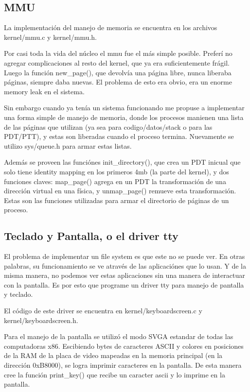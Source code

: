 \subsection{MMU}

La implementación del manejo de memoria se encuentra en los archivos
kernel/mmu.c y kernel/mmu.h.

Por casi toda la vida del núcleo el mmu fue el más simple posible. Preferí no
agregar complicaciones al resto del kernel, que ya era suficientemente frágil.
Luego la función new\_page(), que devolvía una página libre, nunca liberaba
páginas, siempre daba nuevas. El problema de esto era obvio, era un enorme
memory leak en el sistema.

Sin embargo cuando ya tenía un sistema funcionando me propuse a implementar una
forma simple de manejo de memoria, donde los procesos manienen una lista de las
páginas que utilizan (ya sea para codigo/datos/stack o para las PDT/PTT), y
estas son liberadas cuando el proceso termina. Nuevamente se utilizo
sys/queue.h para armar estas listas.

Además se proveen las funciónes init\_directory(), que crea un PDT inicual que
solo tiene identity mapping en los primeros 4mb (la parte del kernel), y dos
funciones claves: map\_page() agrega en un PDT la transformación de una
dirección virtual en una física, y unmap\_page() remueve esta transformación.
Estas son las funciones utilizadas para armar el directorio de páginas de un
proceso.

\subsection{Teclado y Pantalla, o el driver tty}

El problema de implementar un file system es que este no se puede ver. En otras
palabras, su funcionamiento se ve através de las aplicaciónes que lo usan. Y de
la misma manera, no podemos ver estas aplicaciones sin una manera de
interactuar con la pantalla. Es por esto que programe un driver tty para manejo
de pantalla y teclado.

El código de este driver se encuentra en kernel/keyboardscreen.c y
kernel/keyboardscreen.h.

Para el manejo de la pantalla se utilizó el modo SVGA estandar de todas las
computadoras x86. Escibiendo bytes de caracteres ASCII y colores en posiciones
de la RAM de la placa de video mapeadas en la memoria principal (en la
dirección 0xB8000), se logra imprimir caracteres en la pantalla. De esta manera
cree la función print\_key() que recibe un caracter ascii y lo imprime en la
pantalla.

